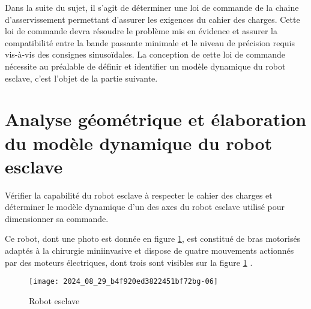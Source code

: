 

Dans la suite du sujet, il s'agit de déterminer une loi de commande de la chaine d'asservissement permettant d'assurer les exigences du cahier des charges. Cette loi de commande devra résoudre le problème mis en évidence et assurer la compatibilité entre la bande passante minimale et le niveau de précision requis vis-à-vis des consignes sinusoïdales. La conception de cette loi de commande nécessite au préalable de définir et identifier un modèle dynamique du robot esclave, c'est l'objet de la partie suivante.

\section{Analyse géométrique et élaboration du modèle dynamique du robot esclave}
\begin{obj}
Vérifier la capabilité du robot esclave à respecter le cahier des charges et déterminer le modèle dynamique d'un des axes du robot esclave utilisé pour dimensionner sa commande.
\end{obj}

Ce robot, dont une photo est donnée en figure \ref{fig_06}, est constitué de bras motorisés adaptés à la chirurgie miniinvasive et dispose de quatre mouvements actionnés par des moteurs électriques, dont trois sont visibles sur la figure \ref{fig_06} .

\begin{figure}[!h]
\centering
\texttt{[image: 2024\_08\_29\_b4f920ed3822451bf72bg-06]}
\caption{\label{fig_06}Robot esclave}
\end{figure}

